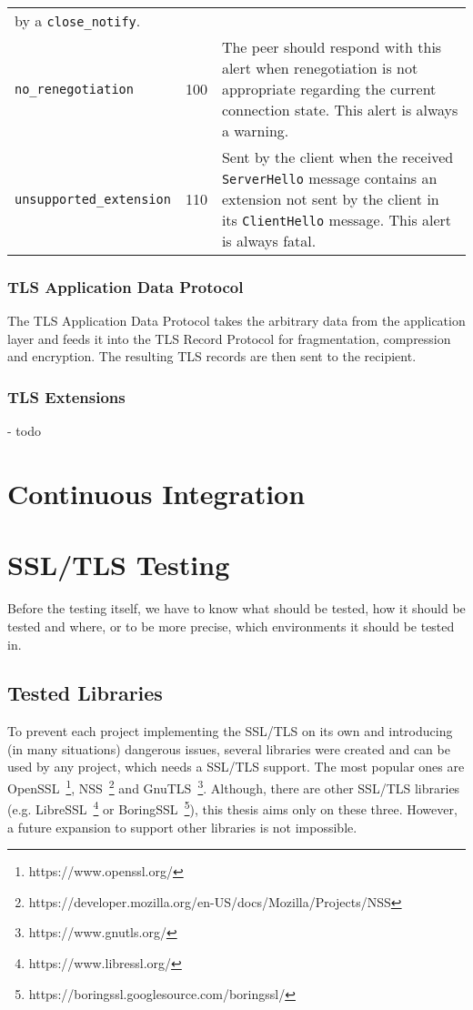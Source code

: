 \begin{tabularx}{\linewidth}{@{}l l X}
                                                  by a \texttt{close\_notify}. \\
    \texttt{no\_renegotiation}            & 100 & The peer should respond with this alert when renegotiation is not appropriate regarding the current connection
                                                  state. This alert is always a warning. \\
    \texttt{unsupported\_extension}       & 110 & Sent by the client when the received \texttt{ServerHello} message contains an extension not sent by the client
                                                  in its \texttt{ClientHello} message. This alert is always fatal.
    \end{tabularx}

\subsection{TLS Application Data Protocol}
    The TLS Application Data Protocol takes the arbitrary data from the application
    layer and feeds it into the TLS Record Protocol for fragmentation, compression
    and encryption. The resulting TLS records are then sent to the recipient.

\subsection{TLS Extensions}
- todo

\chapter{Continuous Integration}

\chapter {SSL/TLS Testing}
    Before the testing itself, we have to know what should be tested, how it
    should be tested and where, or to be more precise, which environments it
    should be tested in.

\section{Tested Libraries}
    To prevent each project implementing the SSL/TLS on its own and introducing
    (in many situations) dangerous issues, several libraries were created and
    can be used by any project, which needs a SSL/TLS support. The most
    popular ones are OpenSSL~\footnote{https://www.openssl.org/},
    NSS~\footnote{https://developer.mozilla.org/en-US/docs/Mozilla/Projects/NSS}
    and GnuTLS~\footnote{https://www.gnutls.org/}. Although, there are other
    SSL/TLS libraries (e.g. LibreSSL~\footnote{https://www.libressl.org/} or
    BoringSSL~\footnote{https://boringssl.googlesource.com/boringssl/}),
    this thesis aims only on these three. However, a future
    expansion to support other libraries is not impossible.

